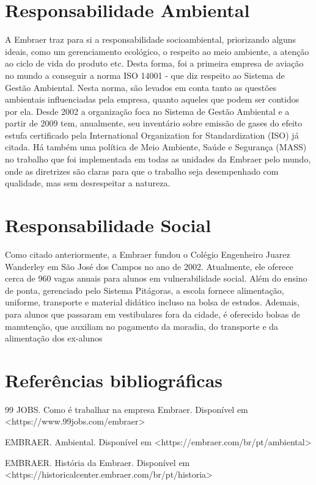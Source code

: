 \documentclass[
    12pt,               %
    openright,          %
    oneside,
    a4paper,            %
    draft,              %
    MODELO,             %
    TODO,               %
    english,            %
    brazil              %
    ]{ifsp-spo-inf-ctds}
\begin{document}
	\section{Responsabilidade Ambiental}
	A Embraer traz para si a responsabilidade socioambiental, priorizando alguns ideais, como um gerenciamento ecológico, o respeito ao meio ambiente, a atenção ao ciclo de vida do produto etc. Desta forma, foi a primeira empresa de aviação no mundo a conseguir a norma ISO 14001 - que diz respeito ao Sistema de Gestão Ambiental. Nesta norma, são levados em conta tanto as questões ambientais influenciadas pela empresa, quanto aqueles que podem ser contidos por ela. Desde 2002 a organização foca no Sistema de Gestão Ambiental e a partir de 2009 tem, anualmente, seu inventário sobre emissão de gases do efeito estufa certificado pela International Organization for Standardization (ISO) já citada. Há também uma política de Meio Ambiente, Saúde e Segurança (MASS) no trabalho que foi implementada em todas as unidades da Embraer pelo mundo, onde as diretrizes são claras para que o trabalho seja desempenhado com qualidade, mas sem desrespeitar a natureza.


    \section{Responsabilidade Social}
    Como citado anteriormente, a Embraer fundou o Colégio Engenheiro Juarez Wanderley em São José dos Campos no ano de 2002. Atualmente, ele oferece cerca de 960 vagas anuais para alunos em vulnerabilidade social. Além do ensino de ponta, gerenciado pelo Sistema Pitágoras, a escola fornece alimentação, uniforme, transporte e material didático incluso na bolsa de estudos. Ademais, para alunos que passaram em vestibulares fora da cidade, é oferecido bolsas de manutenção, que auxiliam no pagamento da moradia, do transporte e da alimentação dos ex-alunos


    
	\section{Referências bibliográficas}
	99 JOBS. Como é trabalhar na empresa Embraer. Disponível em <https://www.99jobs.com/embraer>

EMBRAER. Ambiental. Disponível em <https://embraer.com/br/pt/ambiental>

EMBRAER. História da Embraer. Disponível em <https://historicalcenter.embraer.com/br/pt/historia>
\end{document}
